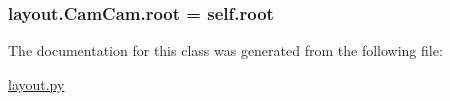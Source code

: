 \subsubsection[{root}]{\setlength{\rightskip}{0pt plus 5cm}layout.\+Cam\+Cam.\+root = self.\+root\hspace{0.3cm}{\ttfamily [static]}}\label{classlayout_1_1_cam_cam_afbd0630f5249f1c8bf78dc83f03df5a0}


The documentation for this class was generated from the following file\+:\begin{DoxyCompactItemize}
\item 
\hyperlink{layout_8py}{layout.\+py}\end{DoxyCompactItemize}
